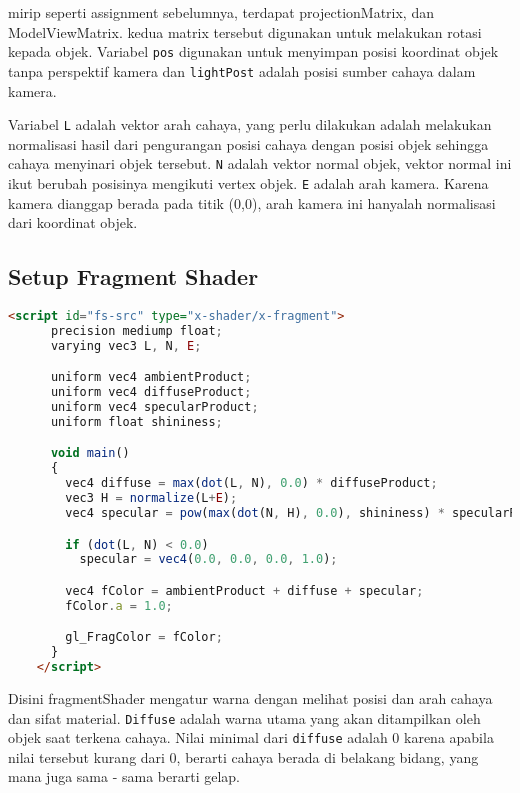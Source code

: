 mirip seperti assignment sebelumnya, terdapat projectionMatrix, dan ModelViewMatrix. kedua matrix tersebut digunakan untuk melakukan rotasi kepada objek. Variabel \texttt{pos} digunakan untuk menyimpan posisi koordinat objek tanpa perspektif kamera dan \texttt{lightPost} adalah posisi sumber cahaya dalam kamera.

Variabel \texttt{L} adalah vektor arah cahaya, yang perlu dilakukan adalah melakukan normalisasi hasil dari pengurangan posisi cahaya dengan posisi objek sehingga cahaya menyinari objek tersebut. \texttt{N} adalah vektor normal objek, vektor normal ini ikut berubah posisinya mengikuti vertex objek. \texttt{E} adalah arah kamera. Karena kamera dianggap berada pada titik (0,0), arah kamera ini hanyalah normalisasi dari koordinat objek.

\subsection*{Setup Fragment Shader}

\begin{lstlisting}[language=html, label={lst: fragmentShader}, caption={file fragmentShader}]
    <script id="fs-src" type="x-shader/x-fragment">
      precision mediump float;
      varying vec3 L, N, E;

      uniform vec4 ambientProduct;
      uniform vec4 diffuseProduct;
      uniform vec4 specularProduct;
      uniform float shininess;

      void main()
      {
        vec4 diffuse = max(dot(L, N), 0.0) * diffuseProduct;
        vec3 H = normalize(L+E);
        vec4 specular = pow(max(dot(N, H), 0.0), shininess) * specularProduct;

        if (dot(L, N) < 0.0)
          specular = vec4(0.0, 0.0, 0.0, 1.0);

        vec4 fColor = ambientProduct + diffuse + specular;
        fColor.a = 1.0;

        gl_FragColor = fColor;
      }
    </script>

\end{lstlisting}

Disini fragmentShader mengatur warna dengan melihat posisi dan arah cahaya dan sifat material. \texttt{Diffuse} adalah warna utama yang akan ditampilkan oleh objek saat terkena cahaya. Nilai minimal dari \texttt{diffuse} adalah 0 karena apabila nilai tersebut kurang dari 0, berarti cahaya berada di belakang bidang, yang mana juga sama - sama berarti gelap.

